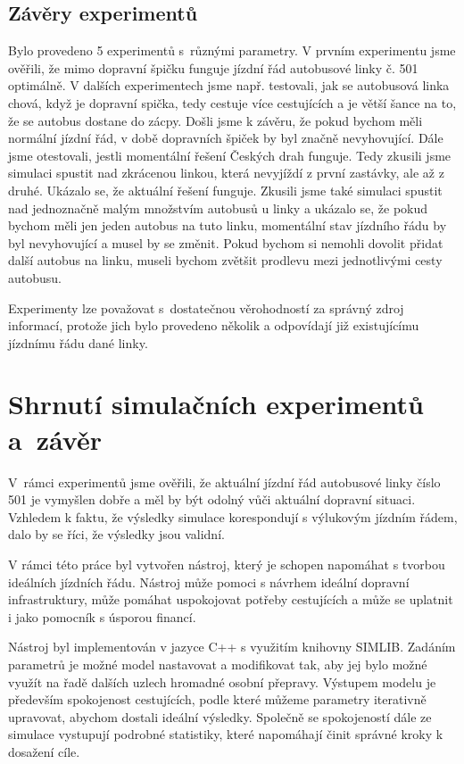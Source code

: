 \documentclass[a4paper]{article}
\begin{document}
        \subsection{Závěry experimentů}
        \label{subsec:experiments_summary}

            Bylo provedeno 5 experimentů s~různými parametry. V prvním experimentu jsme ověřili, že mimo dopravní špičku funguje jízdní řád autobusové linky č. 501 optimálně. V dalších experimentech jsme např. testovali, jak se autobusová linka chová, když je dopravní spička, tedy cestuje více cestujících a je větší šance na to, že se autobus dostane do zácpy. Došli jsme k závěru, že pokud bychom měli normální jízdní řád, v době dopravních špiček by byl značně nevyhovující. Dále jsme otestovali, jestli momentální řešení Českých drah funguje. Tedy zkusili jsme simulaci spustit nad zkrácenou linkou, která nevyjíždí z první zastávky, ale až z druhé. Ukázalo se, že aktuální řešení funguje. Zkusili jsme také simulaci spustit nad jednoznačně malým množstvím autobusů u linky a ukázalo se, že pokud bychom měli jen jeden autobus na tuto linku, momentální stav jízdního řádu by byl nevyhovující a musel by se změnit. Pokud bychom si nemohli dovolit přidat další autobus na linku, museli bychom zvětšit prodlevu mezi jednotlivými cesty autobusu.
            
            
            Experimenty lze považovat s~dostatečnou věrohodností za správný zdroj informací, protože jich bylo provedeno několik a odpovídají již existujícímu jízdnímu řádu dané linky.
\newpage
    \section{Shrnutí simulačních experimentů a~závěr}
    \label{sec:summary}
            V~rámci experimentů jsme ověřili, že aktuální jízdní řád autobusové linky číslo 501 je vymyšlen dobře a měl by být odolný vůči aktuální dopravní situaci. Vzhledem k faktu, že výsledky simulace korespondují s výlukovým jízdním řádem, dalo by se říci, že výsledky jsou validní.

			V rámci této práce byl vytvořen nástroj, který je schopen napomáhat s tvorbou ideálních jízdních řádu. Nástroj může pomoci s návrhem ideální dopravní infrastruktury, může pomáhat uspokojovat potřeby cestujících a může se uplatnit i jako pomocník s úsporou financí. 
			
			Nástroj byl implementován v jazyce C++ s využitím knihovny SIMLIB. Zadáním parametrů je možné model nastavovat a modifikovat tak, aby jej bylo možné využít na řadě dalších uzlech hromadné osobní přepravy. Výstupem modelu je především spokojenost cestujících, podle které můžeme parametry iterativně upravovat, abychom dostali ideální výsledky. Společně se spokojeností dále ze simulace vystupují podrobné statistiky, které napomáhají činit správné kroky k dosažení cíle.
\end{document}
